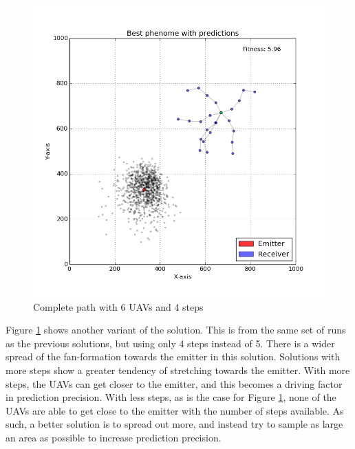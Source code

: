 \documentclass[10pt,a4paper]{book}
\begin{document}
\begin{figure}[H]
\centering
\includegraphics[width=120mm]{uav6steps4.jpg}
\caption{Complete path with 6 \glspl{UAV} and 4 steps}
\label{completepath_uav6_step4}
\end{figure}

Figure \ref{completepath_uav6_step4} shows another variant of the solution. This is from the same set of runs as the previous solutions, but using only 4 steps instead of 5. There is a wider spread of the fan-formation towards the emitter in this solution. Solutions with more steps show a greater tendency of stretching towards the emitter. With more steps, the \glspl{UAV} can get closer to the emitter, and this becomes a driving factor in prediction precision. With less steps, as is the case for Figure \ref{completepath_uav6_step4}, none of the \glspl{UAV} are able to get close to the emitter with the number of steps available. As such, a better solution is to spread out more, and instead try to sample as large an area as possible to increase prediction precision.
\end{document}
